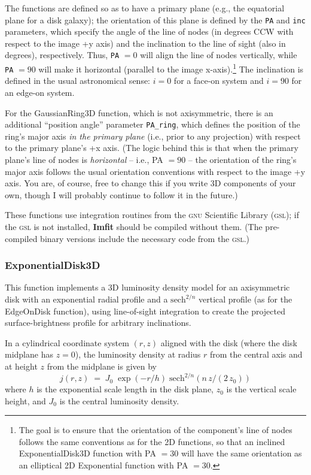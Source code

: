 \documentclass[10pt,a4paper,article]{memoir}
\newcommand{\imfit}{\textbf{Imfit}}
\begin{document}
The functions are defined so as to have a primary plane (e.g., the equatorial
plane for a disk galaxy); the orientation of this plane is defined by the
\texttt{PA} and \texttt{inc} parameters, which specify the angle of the line of
nodes (in degrees CCW with respect to the image +y axis) and the inclination to
the line of sight (also in degrees), respectively. Thus, \texttt{PA} $= 0$ will
align the line of nodes vertically, while \texttt{PA} $= 90$ will make it
horizontal (parallel to the image x-axis).\footnote{The goal is to ensure that
the orientation of the component's line of nodes follows the same conventions as
for the 2D functions, so that an inclined ExponentialDisk3D function with PA $=
30$ will have the same orientation as an elliptical 2D Exponential function with
PA $= 30$.} The inclination is defined in the usual astronomical sense: $i = 0$
for a face-on system and $i = 90$ for an edge-on system.

For the GaussianRing3D function, which is not axisymmetric, there is an
additional ``position angle'' parameter \texttt{PA\_ring}, which defines the position of the
ring's major axis \textit{in the primary plane} (i.e., prior to any projection)
with respect to the primary plane's +x axis. (The logic behind this is that when
the primary plane's line of nodes is \textit{horizontal} -- i.e., PA $= 90$ --
the orientation of the ring's major axis follows the usual orientation
conventions with respect to the image +y axis. You are, of course, free to
change this if you write 3D components of your own, though I will probably
continue to follow it in the future.)

These functions use integration routines from the \textsc{gnu} Scientific Library (\textsc{gsl});
if the \textsc{gsl} is not installed, \imfit{} should be compiled without them. (The
pre-compiled binary versions include the necessary code from the \textsc{gsl}.)


\subsubsection{ExponentialDisk3D}

This function implements a 3D luminosity density model for an axisymmetric
disk with an exponential radial profile and a ${\mathrm{sech}}^{2/n}$ vertical profile
(as for the EdgeOnDisk function), using line-of-sight integration to create the projected
surface-brightness profile for arbitrary inclinations.

In a cylindrical coordinate system $(r, z)$ aligned with the disk (where the disk
midplane has $z = 0$), the luminosity density at radius $r$ from 
the central axis and
at height $z$ from the midplane is given by
\begin{equation}
j(r,z) \; = \; J_{0} \; \exp(-r/h) \; {\mathrm{sech}}^{2/n} (n \, z/(2 \, z_{0}))
\end{equation}
where $h$ is the exponential scale length in the disk plane, $z_{0}$ is the vertical
scale height, and $J_{0}$ is the central luminosity density.
\end{document}
